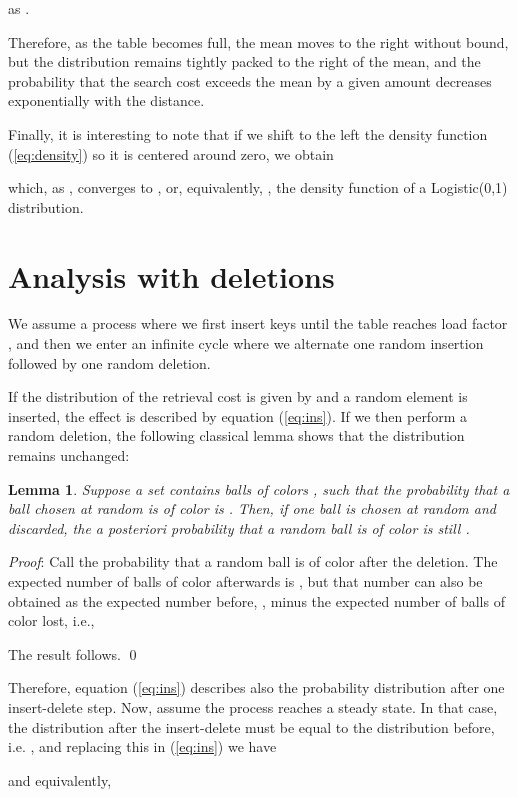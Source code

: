 \documentclass[proceedings]{aofa}
\newtheorem{lemma}{Lemma}
\begin{document}
as .

Therefore, as the table becomes full, the mean moves to the right without bound, but the distribution remains tightly packed to the right of the mean, and the probability that the search cost exceeds the mean by a given amount decreases exponentially with the distance.

Finally, it is interesting to note that if we shift to the left the density function (\ref{eq:density}) so it is centered around zero, we obtain

which, as , converges to , or, equivalently, , the density function of a Logistic(0,1) distribution.

\section{Analysis with deletions}
\label{conborrados}

We assume a process where we first insert keys until the table reaches
load factor , and then we enter an infinite cycle where we alternate
one random insertion followed by one random deletion.

If the distribution of the retrieval cost is given by 
and a random element is inserted, the effect is described by equation
(\ref{eq:ins}).
If we then perform a random deletion, the following classical lemma\cite{feller1} shows that the distribution remains unchanged:

\begin{lemma}\label{lemma:balls}
Suppose a set contains  balls of colors , such that the
probability that a ball chosen at random is of color  is .
Then, if one ball is chosen at random and discarded, the {\em a posteriori}
probability that a random ball is of color  is still .
\end{lemma}
{\em Proof\/}:
Call  the probability that a random ball is of color 
after the deletion.
The expected number of balls of color  afterwards is ,
but that number can also be obtained as the expected number before,
, minus the expected number of balls of color  lost,
i.e.,

The result follows. \qed

Therefore, equation (\ref{eq:ins}) describes also the probability distribution
after one insert-delete step.
Now, assume the process reaches a steady state.
In that case, the distribution after the insert-delete must be equal
to the distribution before, i.e. ,
and replacing this in (\ref{eq:ins}) we have

and equivalently,
\end{document}
